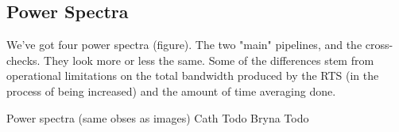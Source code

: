 \subsection{Power Spectra}
We've got four power spectra (figure). The two "main" pipelines, and the cross-checks. They look more or less the same. Some of the differences stem from operational limitations on the total bandwidth produced by the RTS (in the process of being increased) and the amount of time averaging done.  

Power spectra (same obses as images)
Cath Todo
Bryna Todo